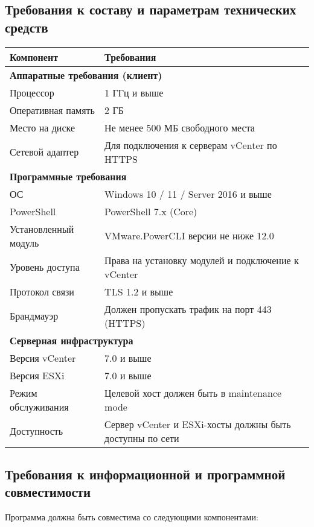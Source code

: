 \subsection{Требования к составу и параметрам технических средств}
\begin{table}[h]
\centering
\begin{tabular}{|p{7cm}|p{8cm}|}
\hline
\textbf{Компонент} & \textbf{Требования} \\ \hline
\multicolumn{2}{|p{15cm}|}{\textbf{Аппаратные требования (клиент)}} \\ \hline
Процессор & 1 ГГц и выше \\ \hline
Оперативная память & 2 ГБ \\ \hline
Место на диске & Не менее 500 МБ свободного места \\ \hline
Сетевой адаптер & Для подключения к серверам vCenter по HTTPS \\ \hline
\multicolumn{2}{|l|}{\textbf{Программные требования}} \\ \hline
ОС & Windows 10 / 11 / Server 2016 и выше \\ \hline
PowerShell & PowerShell 7.x (Core) \\ \hline
Установленный модуль & VMware.PowerCLI версии не ниже 12.0 \\ \hline
Уровень доступа & Права на установку модулей и подключение к vCenter \\ \hline
Протокол связи & TLS 1.2 и выше \\ \hline
Брандмауэр & Должен пропускать трафик на порт 443 (HTTPS) \\ \hline
\multicolumn{2}{|l|}{\textbf{Серверная инфраструктура}} \\ \hline
Версия vCenter & 7.0 и выше \\ \hline
Версия ESXi & 7.0 и выше \\ \hline
Режим обслуживания & Целевой хост должен быть в maintenance mode \\ \hline
Доступность & Сервер vCenter и ESXi-хосты должны быть доступны по сети \\ \hline
\end{tabular}
\end{table}

\subsection{Требования к информационной и программной совместимости}
Программа должна быть совместима со следующими компонентами:

